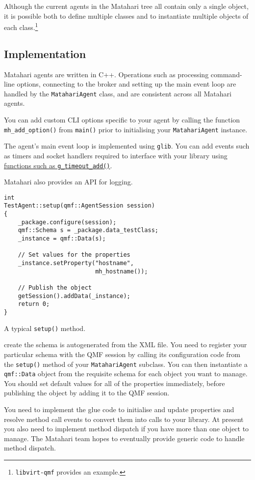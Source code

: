 Although the current agents in the Matahari tree all contain only a single object, it is possible both to define multiple classes and to instantiate multiple objects of each class.\footnote{\texttt{libvirt-qmf} provides an example.}

\subsection{Implementation}

Matahari agents are written in C++.
Operations such as processing command-line options, connecting to the broker and setting up the main event loop are handled by the \texttt{MatahariAgent} class, and are consistent across all Matahari agents.

You can add custom CLI options specific to your agent by calling the function \texttt{mh\_add\_option()} from \texttt{main()} prior to initialising your \texttt{MatahariAgent} instance.

The agent's main event loop is implemented using \texttt{glib}. You can add events such as timers and socket handlers required to interface with your library using \href{http://developer.gnome.org/glib/2.29/glib-The-Main-Event-Loop.html}{functions such as \texttt{g\_timeout\_add()}}.

Matahari also provides an API for logging.

\begin{marginfigure}
\begin{Verbatim}
int
TestAgent::setup(qmf::AgentSession session)
{
    _package.configure(session);
    qmf::Schema s = _package.data_testClass;
    _instance = qmf::Data(s);

    // Set values for the properties
    _instance.setProperty("hostname",
                          mh_hostname());

    // Publish the object
    getSession().addData(_instance);
    return 0;
}
\end{Verbatim}
\caption{A typical \texttt{setup()} method.}
\end{marginfigure}

 create the schema is autogenerated from the XML file. You need to register your particular schema with the QMF session by calling its configuration code from the \texttt{setup()} method of your \texttt{MatahariAgent} subclass.
You can then instantiate a \texttt{qmf::Data} object from the requisite schema for each object you want to manage. You should set default values for all of the properties immediately, before publishing the object by adding it to the QMF session.

You need to implement the glue code to initialise and update properties and resolve method call events to convert them into calls to your library.
At present you also need to implement method dispatch if you have more than one object to manage. The Matahari team hopes to eventually provide generic code to handle method dispatch.


